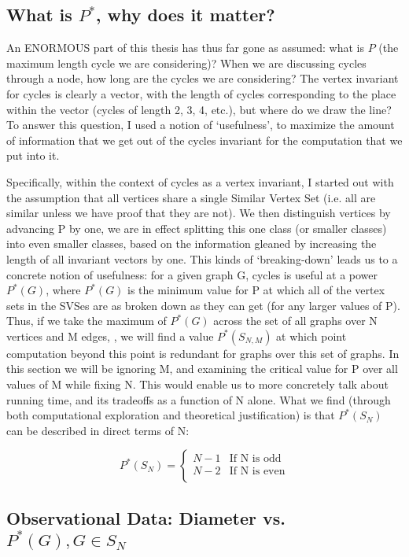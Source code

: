 \subsection{What is $P^*$, why does it matter?}

An ENORMOUS part of this thesis has thus far gone as assumed: what is $P$ (the maximum length cycle we are considering)?
When we are discussing cycles through a node, how long are the cycles we are considering?
The vertex invariant for cycles is clearly a vector, with the length of cycles corresponding to the place within the vector (cycles of length 2, 3, 4, etc.), but where do we draw the line?
To answer this question, I used a notion of `usefulness', to maximize the amount of information that we get out of the cycles invariant for the computation that we put into it.

Specifically, within the context of cycles as a vertex invariant, I started out with the assumption that all vertices share a single Similar Vertex Set (i.e. all are similar unless we have proof that they are not).
We then distinguish vertices by advancing P by one, we are in effect splitting this one class (or smaller classes) into even smaller classes, based on the information gleaned by increasing the length of all invariant vectors by one.
This kinds of `breaking-down' leads us to a concrete notion of usefulness: for a given graph G, cycles is useful at a power $P^*(G)$, where $P^*(G)$ is the minimum value for P at which all of the vertex sets in the SVSes are as broken down as they can get (for any larger values of P).
Thus, if we take the maximum of $P^*(G)$ across the set of all graphs over N vertices and M edges, , we will find a value $P^*(S_{N,M})$ at which point computation beyond this point is redundant for graphs over this set of graphs.
In this section we will be ignoring M, and examining the critical value for P over all values of M while fixing N.
This would enable us to more concretely talk about running time, and its tradeoffs as a function of N alone.
What we find (through both computational exploration and theoretical justification) is that $P^*(S_{N})$ can be described in direct terms of N:

\[ P^*(S_{N}) = \begin{cases} 
      N-1 & \text{If N is odd} \\
      N-2 & \text{If N is even} \\
   \end{cases}
\]

\subsection{Observational Data: Diameter vs. $P^*(G), G \in S_N$}

